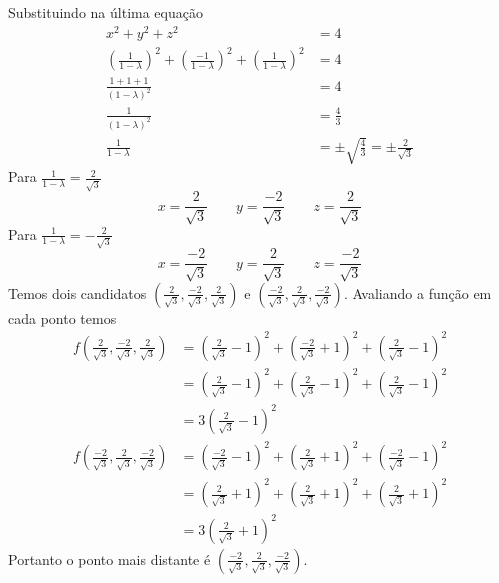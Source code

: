 \documentclass[a4paper,12pt,fleqn]{article}
\begin{document}
\begin{answer}
  Substituindo na última equação
  \begin{align*}
    x^2 + y^2 + z^2 & = 4
    \\[2mm]
    \left(\frac{1}{1-\lambda}\right)^2 +
    \left(\frac{-1}{1-\lambda}\right)^2 +
    \left(\frac{1}{1-\lambda}\right)^2 & = 4
    \\[2mm]
    \frac{1 + 1 + 1}{\left(1-\lambda\right)^2} & = 4
    \\[2mm]
    \frac{1}{\left(1-\lambda\right)^2} & = \frac{4}{3}
    \\[2mm]
    \frac{1}{1-\lambda} & = \pm\sqrt{\frac{4}{3}}
    = \pm\frac{2}{\sqrt{3}}
  \end{align*}
  Para \(\frac{1}{1-\lambda} = \frac{2}{\sqrt{3}}\)
  \[
  x = \frac{2}{\sqrt{3}}
  \qquad
  y = \frac{-2}{\sqrt{3}}
  \qquad
  z = \frac{2}{\sqrt{3}}
  \]
  Para \(\frac{1}{1-\lambda} = -\frac{2}{\sqrt{3}}\)
  \[
  x = \frac{-2}{\sqrt{3}}
  \qquad
  y = \frac{2}{\sqrt{3}}
  \qquad
  z = \frac{-2}{\sqrt{3}}
  \]
  Temos dois candidatos
  \(\left( \frac{2}{\sqrt{3}}, \frac{-2}{\sqrt{3}}, \frac{2}{\sqrt{3}}\right)\) e
  \(\left( \frac{-2}{\sqrt{3}}, \frac{2}{\sqrt{3}}, \frac{-2}{\sqrt{3}}\right)\).
  Avaliando a função em cada ponto temos
  \begin{align*}
    f\left( \frac{2}{\sqrt{3}}, \frac{-2}{\sqrt{3}}, \frac{2}{\sqrt{3}}\right)
    & = \left(\frac{ 2}{\sqrt{3}}-1\right)^2
    + \left(\frac{-2}{\sqrt{3}}+1\right)^2
    + \left(\frac{ 2}{\sqrt{3}}-1\right)^2 \\[2mm]
    & = \left(\frac{2}{\sqrt{3}}-1\right)^2
    + \left(\frac{2}{\sqrt{3}}-1\right)^2
    + \left(\frac{2}{\sqrt{3}}-1\right)^2 \\[2mm]
    & = 3\left(\frac{2}{\sqrt{3}}-1\right)^2
  \end{align*}
  \begin{align*}
    f\left( \frac{-2}{\sqrt{3}}, \frac{2}{\sqrt{3}}, \frac{-2}{\sqrt{3}}\right)
    & = \left(\frac{-2}{\sqrt{3}}-1\right)^2
    + \left(\frac{ 2}{\sqrt{3}}+1\right)^2
    + \left(\frac{-2}{\sqrt{3}}-1\right)^2 \\[2mm]
    & = \left(\frac{2}{\sqrt{3}}+1\right)^2
    + \left(\frac{2}{\sqrt{3}}+1\right)^2
    + \left(\frac{2}{\sqrt{3}}+1\right)^2 \\[2mm]
    & = 3\left(\frac{2}{\sqrt{3}}+1\right)^2
  \end{align*}
  Portanto o ponto mais distante é
  \(\left( \frac{-2}{\sqrt{3}}, \frac{2}{\sqrt{3}}, \frac{-2}{\sqrt{3}}\right)\).
  \clearpage
\end{answer}
\end{document}
